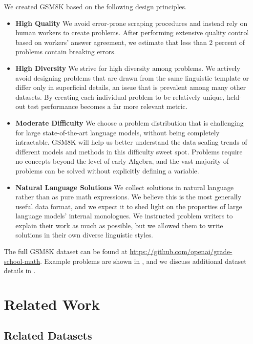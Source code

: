{We created GSM8K based on the following design principles.

\begin{itemize}
    \item \textbf{High Quality} We avoid error-prone scraping procedures and instead rely on human workers to create problems. After performing extensive quality control based on workers' answer agreement, we estimate that less than 2 percent of problems contain breaking errors.
    \item \textbf{High Diversity} We strive for high diversity among problems. We actively avoid designing problems that are drawn from the same linguistic template or differ only in superficial details, an issue that is prevalent among many other datasets. By creating each individual problem to be relatively unique, held-out test performance becomes a far more relevant metric.
    \item \textbf{Moderate Difficulty} We choose a problem distribution that is challenging for large state-of-the-art language models, without being completely intractable. GSM8K will help us better understand the data scaling trends of different models and methods in this difficulty sweet spot. Problems require no concepts beyond the level of early Algebra, and the vast majority of problems can be solved without explicitly defining a variable.
    \item \textbf{Natural Language Solutions} We collect solutions in natural language rather than as pure math expressions. We believe this is the most generally useful data format, and we expect it to shed light on the properties of large language models’ internal monologues. We instructed problem writers to explain their work as much as possible, but we allowed them to write solutions in their own diverse linguistic styles. 
\end{itemize}

The full GSM8K dataset can be found at \href{https://github.com/openai/grade-school-math}{https://github.com/openai/grade-school-math}. Example problems are shown in , and we discuss additional dataset details in .

\section{Related Work} \label{section:related}

\subsection{Related Datasets} 

}
